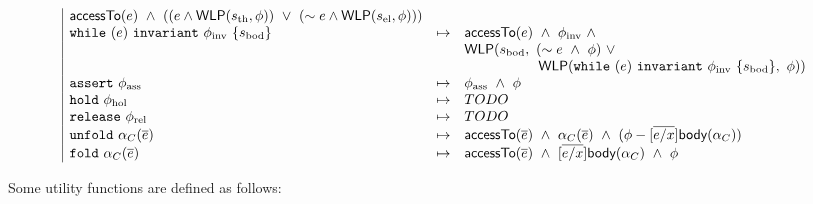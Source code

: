 \begin{spacing}{1.5}
\begin{align*}
\begin{array}{l}
\begin{array}{|lcl}
  \tsf{accessTo}(e) \ \land \
  ((e \land \WLP(s_\text{th}, \phi)) \ \lor \
  (\pnot e \land \WLP(s_\text{el}, \phi)))
\\
\code{while} \ (e) \ \code{invariant} \ \phi_\text{inv} \ \{ s_\text{bod} \} &\mapsto&
  \tsf{accessTo}(e) \ \land \
  \phi_\text{inv} \ \land \\ &&
  \WLP(s_\text{bod}, \
    (\pnot e \ \land \ \phi) \ \lor \ \\ && \hspace{5.3em}
    \WLP(\code{while} \ (e) \ \code{invariant} \ \phi_\text{inv} \ \{ s_\text{bod} \}, \ \phi)
  )
\\
\code{assert} \ \phi_\text{ass} &\mapsto&
  \phi_\text{ass} \ \land \ \phi
\\
\code{hold} \ \phi_\text{hol} &\mapsto&
  TODO
\\
\code{release} \ \phi_\text{rel} &\mapsto&
  TODO
\\
\code{unfold} \ \alpha_C(\overline{e}) &\mapsto&
  \tsf{accessTo}(\overline{e}) \ \land \
  \alpha_C(\overline{e}) \ \land \
  (\phi - [ \overline{e/x} ] \tsf{body}(\alpha_C))
\\
\code{fold} \ \alpha_C(\overline{e}) &\mapsto&
  \tsf{accessTo}(\overline{e}) \ \land \
  [ \overline{e/x} ] \tsf{body}(\alpha_C) \ \land \
  \phi
%
\end{array}
\end{array}
\end{align*}
\end{spacing}

\newpage
\noindent
Some utility functions are defined as follows:

